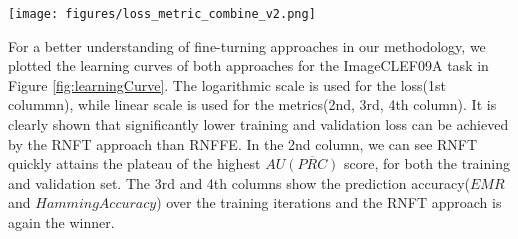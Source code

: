 \documentclass[wcp]{jmlr}
\begin{document}

\begin{figure*}
    \begin{center}
    \texttt{[image: figures/loss\_metric\_combine\_v2.png]}
    \end{center}
    \caption{Learning curves from from the left to right: loss, $AU\overline{(PRC)}$, $EMR$, $Hamming$}
    \label{fig:learningCurve}
\end{figure*}


For a better understanding of fine-turning approaches in our methodology, we plotted the learning curves of both approaches for the ImageCLEF09A task in Figure \ref{fig:learningCurve}. The logarithmic scale is used for the loss(1st colummn), while linear scale is used for the metrics(2nd, 3rd, 4th column).
It is clearly shown that significantly lower training and validation loss can be achieved by the RNFT approach than RNFFE. %
In the 2nd column, we can see RNFT quickly attains the plateau of the highest $AU\overline{(PRC)}$ score, for both the training and validation set. The 3rd and 4th columns show the prediction accuracy($EMR$ and $HammingAccuracy$) over the training iterations and the RNFT approach is again the winner. %
\end{document}
